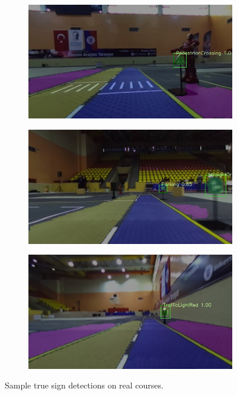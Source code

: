 \begin{figure}[h]
\begin{subfigure}[b]{0.45\linewidth}
  \end{subfigure}
  \begin{subfigure}[b]{0.45\linewidth}
    \includegraphics[width=\linewidth]{figures/experiments/real/pedestrian-crossing.jpg}
  \end{subfigure}
  \begin{subfigure}[b]{0.45\linewidth}
    \includegraphics[width=\linewidth]{figures/experiments/real/straightorright.jpg}
  \end{subfigure}
  \begin{subfigure}[b]{0.45\linewidth}
    \includegraphics[width=\linewidth]{figures/experiments/real/trafficlightred.jpg}
  \end{subfigure}
  \caption[True sign detections on real courses]{Sample true sign
    detections on real courses.}
  \label{figure:real-course-detection-good}
\end{figure}


